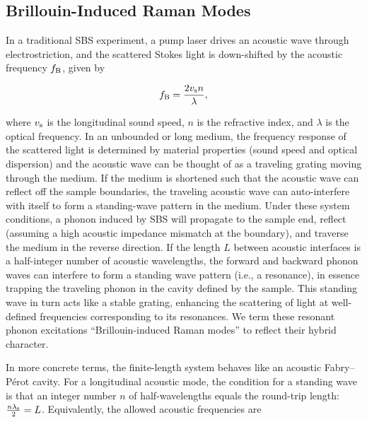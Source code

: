 \subsection{Brillouin-Induced Raman Modes}
\label{subsec:Raman:Brillouin-InducedRamanModes}

In a traditional SBS experiment, a pump laser drives an acoustic wave through electrostriction, and the scattered Stokes light is down-shifted by the acoustic frequency \(f_{\rm B}\), given by \cite{boyd2020nonlinear}

\begin{equation}
  f_{\rm B} = \frac{2v_{\rm s}n}{\lambda},
  \label{eq:Raman:f_B}
\end{equation}

where \(v_{\rm s}\) is the longitudinal sound speed, \(n\) is the refractive index, and \(\lambda\) is the optical frequency. In an unbounded or long medium, the frequency response of the scattered light is determined by material properties (sound speed and optical dispersion) and the acoustic wave can be thought of as a traveling grating moving through the medium. If the medium is shortened such that the acoustic wave can reflect off the sample boundaries, the traveling acoustic wave can auto-interfere with itself to form a standing-wave pattern in the medium. Under these system conditions, a phonon induced by \ac{SBS} will propagate to the sample end, reflect (assuming a high acoustic impedance mismatch at the boundary), and traverse the medium in the reverse direction. If the length \(L\) between acoustic interfaces is a half-integer number of acoustic wavelengths, the forward and backward phonon waves can interfere to form a standing wave pattern (i.e., a resonance), in essence trapping the traveling phonon in the cavity defined by the sample. This standing wave in turn acts like a stable grating, enhancing the scattering of light at well-defined frequencies corresponding to its resonances. We term these resonant phonon excitations “Brillouin-induced Raman modes” to reflect their hybrid character.

In more concrete terms, the finite-length system behaves like an acoustic Fabry–Pérot cavity. For a longitudinal acoustic mode, the condition for a standing wave is that an integer number \(n\) of half-wavelengths equals the round-trip length: \(\frac {n\lambda_{\rm s}}{2} = L\). Equivalently, the allowed acoustic frequencies are

